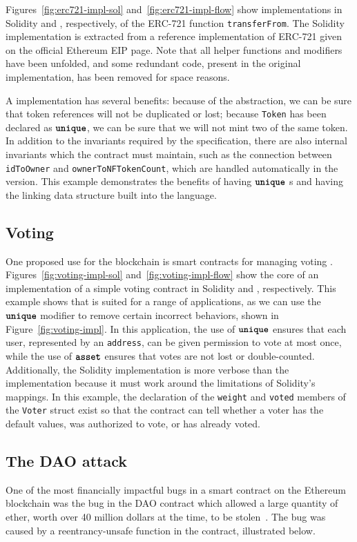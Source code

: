 \documentclass[dvipsnames, usenames, sigconf]{acmart}
\begin{document}
Figures~\ref{fig:erc721-impl-sol} and~\ref{fig:erc721-impl-flow} show implementations in Solidity and \langName, respectively, of the ERC-721 function \lstinline{transferFrom}.
The Solidity implementation is extracted from a reference implementation of ERC-721 given on the official Ethereum EIP page.
Note that all helper functions and modifiers have been unfolded, and some redundant code, present in the original implementation, has been removed for space reasons.

A \langName implementation has several benefits: because of the \assetTxt abstraction, we can be sure that token references will not be duplicated or lost; because \lstinline{Token} has been declared as $\textbf{\texttt{unique}}$, we can be sure that we will not mint two of the same token.
In addition to the invariants required by the specification, there are also internal invariants which the contract must maintain, such as the connection between \lstinline{idToOwner} and \lstinline{ownerToNFTokenCount}, which are handled automatically in the \langName version.
This example demonstrates the benefits of having $\textbf{\texttt{unique}}$ \assetTxt{}s and having the linking data structure built into the language.

\subsection{Voting}\label{sec:voting-impl}
One proposed use for the blockchain is smart contracts for managing voting .
Figures~\ref{fig:voting-impl-sol} and~\ref{fig:voting-impl-flow} show the core of an implementation of a simple voting contract in Solidity and \langName, respectively.
This example shows that \langName is suited for a range of applications, as we can use the $\textbf{\texttt{unique}}$ modifier to remove certain incorrect behaviors, shown in Figure~\ref{fig:voting-impl}.
In this application, the use of $\textbf{\texttt{unique}}$ ensures that each user, represented by an \lstinline{address}, can be given permission to vote at most once, while the use of $\textbf{\texttt{asset}}$ ensures that votes are not lost or double-counted.
Additionally, the Solidity implementation is more verbose than the \langName implementation because it must work around the limitations of Solidity's mappings.
In this example, the declaration of the \lstinline{weight} and \lstinline{voted} members of the \lstinline{Voter} struct exist so that the contract can tell whether a voter has the default values, was authorized to vote, or has already voted.

\subsection{The DAO attack}\label{sec:ex-dao-attack}
One of the most financially impactful bugs in a smart contract on the Ethereum blockchain was the bug in the DAO contract which allowed a large quantity of ether, worth over 40 million dollars at the time, to be stolen~\cite{OlivaEtAl2019}.
The bug was caused by a reentrancy-unsafe function in the contract, illustrated below.
\end{document}
